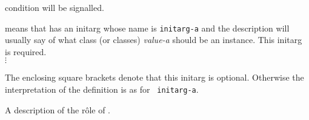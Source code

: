 \begin{optDefinition}
condition will be signalled.
%
%
\begin{initoptions}
    \item[initarg-a, value-a] means that {\tt <a-class>} has an
    initarg whose name is {\tt initarg-a} and the description will usually
    say of what class (or classes) {\em value-a} should be an instance.
    This initarg is required.\\ $\vdots$
    \item[{\tt[}initarg-n, value-n{\tt]}]
    The enclosing square brackets denote that this initarg is optional.
    Otherwise the interpretation of the definition is as for {\tt
        initarg-a}.
\end{initoptions}
%
\remarks%
A description of the r\^ole of {\tt <a-class>}.
%
\end{optDefinition}
%

